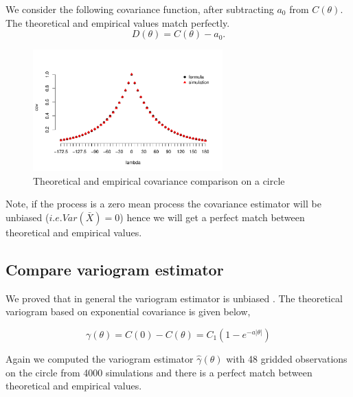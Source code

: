 \begin{itemize}
	      We consider the following covariance function, after subtracting $a_0$ from $C(\theta)$. The theoretical and empirical values match perfectly.
	      \[
	      	D(\theta) = C(\theta) - a_0.
	      \]
	      	      
	      	      
	      \begin{figure}[H]
	      	\centering
	      	\includegraphics[width=0.65\textwidth]{graphs/Summary-covarince_circle_2}
	      	\caption {Theoretical and empirical covariance comparison on a circle}
	      \end{figure}
	      	      
	      Note, if the process is a zero mean process the covariance estimator will be unbiased ($i.e. Var(\bar{X}) = 0$) hence we will get a perfect match between theoretical and empirical values.
	      	      
\end{itemize}

\subsection{Compare variogram estimator} 

We proved that in general the variogram estimator is unbiased . The theoretical variogram based on exponential covariance is given below,   

\[
	\gamma(\theta) = C(0) - C(\theta) = C_1(1-e^{-a|\theta|})
\]

Again we computed the variogram estimator $\hat{\gamma}(\theta)$ with 48 gridded observations on the circle from 4000 simulations and there is a perfect match between theoretical and empirical values.


